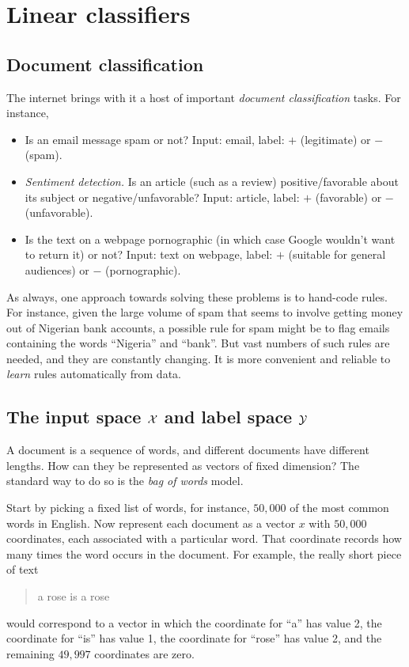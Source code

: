 \section{Linear classifiers}

\subsection{Document classification}

The internet brings with it a host of important {\it document classification} tasks.
For instance,
\begin{itemize}
\item Is an email message spam or not? Input: email, label: $+$ (legitimate) or $-$ (spam).
\item {\it Sentiment detection.} Is an article (such as a review) positive/favorable about 
its subject or negative/unfavorable? Input: article, label: $+$ (favorable) or $-$ 
(unfavorable).
\item Is the text on a webpage pornographic (in which case Google wouldn't want to return
it) or not? Input: text on webpage, label: $+$ (suitable for general audiences) or $-$ 
(pornographic).
\end{itemize}

As always, one approach towards solving these problems is to hand-code rules. For instance, 
given the large volume of spam that seems to involve getting money out of Nigerian bank 
accounts, a possible rule for spam might be to flag emails containing the words 
``Nigeria'' and ``bank''. But vast numbers of such rules are needed, and they are
constantly changing. It is more convenient and reliable to {\it learn} rules 
automatically from data.

\subsection{The input space ${\cal X}$ and label space ${\cal Y}$}

A document is a sequence of words, and different documents have different lengths. How can
they be represented as vectors of fixed dimension? The standard way to do so is the 
{\it bag of words} model.

Start by picking a fixed list of words, for instance, $50{,}000$ of the most common words
in English. Now represent each document as a vector $x$ with $50{,}000$ coordinates, each
associated with a particular word. That coordinate records how many times the word occurs
in the document. For example, the really short piece of text
\begin{quote}
a rose is a rose
\end{quote}
would correspond to a vector in which the coordinate for ``a'' has value 2, the
coordinate for ``is'' has value 1, the coordinate for ``rose'' has value 2,
and the remaining $49,997$ coordinates are zero.

